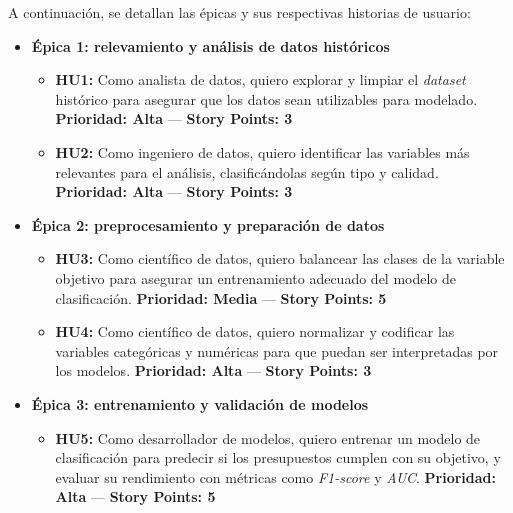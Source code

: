 \documentclass[
11pt, %
]{charter}
\begin{document}
A continuación, se detallan las épicas y sus respectivas historias de usuario:

\begin{itemize}
  \item \textbf{Épica 1: relevamiento y análisis de datos históricos}
    \begin{itemize}
      \item \textbf{HU1:} Como analista de datos, quiero explorar y limpiar el \textit{dataset} histórico para asegurar que los datos sean utilizables para modelado.  
      \newline \textbf{Prioridad: Alta} — \textbf{Story Points: 3}
      
      \item \textbf{HU2:} Como ingeniero de datos, quiero identificar las variables más relevantes para el análisis, clasificándolas según tipo y calidad.  
      \newline \textbf{Prioridad: Alta} — \textbf{Story Points: 3}
    \end{itemize}

  \item \textbf{Épica 2: preprocesamiento y preparación de datos}
    \begin{itemize}
      \item \textbf{HU3:} Como científico de datos, quiero balancear las clases de la variable objetivo para asegurar un entrenamiento adecuado del modelo de clasificación.  
      \newline \textbf{Prioridad: Media} — \textbf{Story Points: 5}

      \item \textbf{HU4:} Como científico de datos, quiero normalizar y codificar las variables categóricas y numéricas para que puedan ser interpretadas por los modelos.  
      \newline \textbf{Prioridad: Alta} — \textbf{Story Points: 3}
    \end{itemize}

  \item \textbf{Épica 3: entrenamiento y validación de modelos}
    \begin{itemize}
      \item \textbf{HU5:} Como desarrollador de modelos, quiero entrenar un modelo de clasificación para predecir si los presupuestos cumplen con su objetivo, y evaluar su rendimiento con métricas como \textit{F1-score} y \textit{AUC}.  
      \newline \textbf{Prioridad: Alta} — \textbf{Story Points: 5}


\end{itemize}
\end{itemize}
\end{document}
